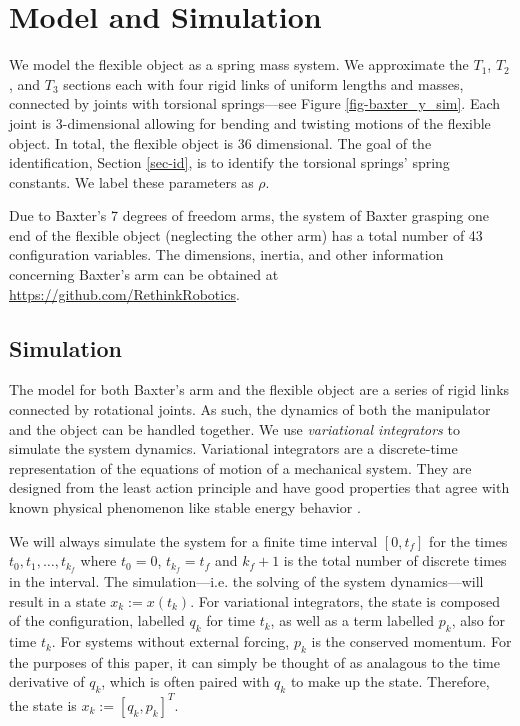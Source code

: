 \documentclass[runningheads,a4paper]{llncs}
\begin{document}
\section{Model and Simulation \label{sec-sim}}
\label{sec-sim}
We model the flexible object as a spring mass system. We approximate the $T_1$, $T_2$, and $T_3$ sections each with four rigid links of uniform lengths and masses, connected by joints with torsional springs---see Figure \ref{fig-baxter_y_sim}. Each joint is 3-dimensional allowing for bending and twisting motions of the flexible object. In total, the flexible object is 36 dimensional. The goal of the identification, Section \ref{sec-id}, is to identify the torsional springs' spring constants. We label these parameters as $\rho$.

Due to Baxter's 7 degrees of freedom arms, the system of Baxter grasping one end of the flexible object (neglecting the other arm) has a total number of 43 configuration variables. The dimensions, inertia, and other information concerning Baxter's arm can be obtained at \url{https://github.com/RethinkRobotics}.  

\subsection{Simulation}
The model for both Baxter's arm and the flexible object are a series of rigid links connected by rotational joints. As such, the dynamics of both the manipulator and the object can be handled together. We use \emph{variational integrators} to simulate the system dynamics.   Variational integrators are a discrete-time representation of the equations of motion of a mechanical system.  They are designed from the least action principle and have good properties that agree with known physical phenomenon like stable energy behavior \cite{pekarek_murphey}.  

We will always simulate the system for a finite time interval $[0,t_f]$ for the times $t_0,t_1,\ldots,t_{k_f}$ where $t_0 = 0$, $t_{k_f} = t_f$ and $k_f+1$ is the total number of discrete times in the interval. The simulation---i.e. the solving of the system dynamics---will result in a state $x_k:=x(t_k)$.  For variational integrators, the state is composed of the configuration, labelled $q_k$ for time $t_k$, as well as a term labelled $p_k$, also for time $t_k$. For systems without external forcing, $p_k$ is the conserved momentum.  For the purposes of this paper, it can simply be thought of as analagous to the time derivative of $q_k$, which is often paired with $q_k$ to make up the state.  Therefore, the state is $x_k:=[q_k,p_k]^T$. 
\end{document}

